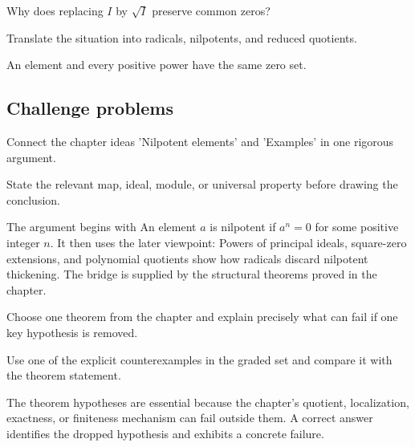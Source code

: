\begin{exercise}\label{exr:v03-expand-14}
Why does replacing $I$ by $\sqrt I$ preserve common zeros?
\end{exercise}
\begin{hint}
Translate the situation into radicals, nilpotents, and reduced quotients.
\end{hint}
\begin{solution}
An element and every positive power have the same zero set.
\end{solution}

\subsection*{Challenge problems}

\begin{exercise}\label{exr:v03-expand-15}
Connect the chapter ideas 'Nilpotent elements' and 'Examples' in one rigorous argument.
\end{exercise}
\begin{hint}
State the relevant map, ideal, module, or universal property before drawing the conclusion.
\end{hint}
\begin{solution}
The argument begins with An element $a$ is nilpotent if $a^n=0$ for some positive integer $n$. It then uses the later viewpoint: Powers of principal ideals, square-zero extensions, and polynomial quotients show how radicals discard nilpotent thickening. The bridge is supplied by the structural theorems proved in the chapter.
\end{solution}

\begin{exercise}\label{exr:v03-expand-16}
Choose one theorem from the chapter and explain precisely what can fail if one key hypothesis is removed.
\end{exercise}
\begin{hint}
Use one of the explicit counterexamples in the graded set and compare it with the theorem statement.
\end{hint}
\begin{solution}
The theorem hypotheses are essential because the chapter's quotient, localization, exactness, or finiteness mechanism can fail outside them. A correct answer identifies the dropped hypothesis and exhibits a concrete failure.
\end{solution}

